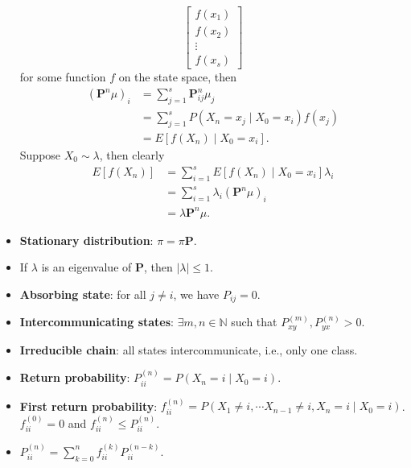 \documentclass[10pt]{article}
\newcommand{\abs}[1]{\left\lvert#1\right\rvert}
\begin{document}
\begin{multicols*}{2}
\begin{itemize}
\begin{equation*}
\begin{bmatrix}
                    f\left(x_1\right) \\
                    f\left(x_2\right) \\
                    \vdots \\
                    f\left(x_s\right)
                \end{bmatrix}
            \end{equation*}
            for some function $f$ on the state space, then 
            \begin{align*}
                \left(\bm{P}^n\mu\right)_i & = \sum_{j = 1}^{s}\bm{P}^n_{ij}\mu_j \\
                & = \sum_{j = 1}^{s}P\left(X_n = x_j \mid X_0 = x_i\right)f\left(x_j\right) \\
                & = E\left[f\left(X_n\right) \mid X_0 = x_i\right].
            \end{align*}
            Suppose $X_0 \sim \lambda$, then clearly 
            \begin{align*}
                E\left[f\left(X_n\right)\right] & = \sum_{i = 1}^{s}E\left[f\left(X_n\right) \mid X_0 = x_i\right]\lambda_i \\
                & = \sum_{i = 1}^{s}\lambda_i\left(\bm{P}^n\mu\right)_i \\
                & = \lambda\bm{P}^n\mu.
            \end{align*}
            \item \textbf{Stationary distribution}: $\pi = \pi\bm{P}$.
            \item If $\lambda$ is an eigenvalue of $\bm{P}$, then $\abs{\lambda} \leq 1$.
            \item \textbf{Absorbing state}: for all $j \neq i$, we have $P_{ij} = 0$.
            \item \textbf{Intercommunicating states}: $\exists m, n \in \mathbb{N}$ such that $P_{xy}^{\left(m\right)}, P_{yx}^{\left(n\right)} > 0$.
            \item \textbf{Irreducible chain}: all states intercommunicate, i.e., only one class.
            \item \textbf{Return probability}: $P_{ii}^{\left(n\right)} = P\left(X_n = i \mid X_0 = i\right)$.
            \item \textbf{First return probability}: $f_{ii}^{\left(n\right)} = P\left(X_1 \neq i, \cdots X_{n - 1} \neq i, X_n = i \mid X_0 = i\right)$. $f_{ii}^{\left(0\right)} = 0$ and $f_{ii}^{\left(n\right)} \leq P_{ii}^{\left(n\right)}$.
            \item $P_{ii}^{\left(n\right)} = \sum_{k = 0}^{n}f_{ii}^{\left(k\right)}P_{ii}^{\left(n - k\right)}$.

\end{itemize}
\end{multicols*}
\end{document}
